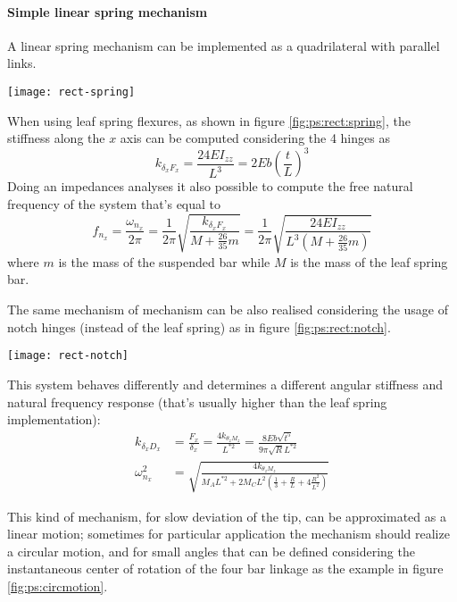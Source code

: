 		\paragraph{Simple linear spring mechanism} A linear spring mechanism can be implemented as a quadrilateral with parallel links.
		
		\begin{SCfigure}[2][bht]
			\centering
			\texttt{[image: rect-spring]}
			\caption{implementation of a rectilinear motion with leaf spring flexures.}
			\label{fig:ps:rect:spring}
		\end{SCfigure}
	
		When using leaf spring flexures, as shown in figure \ref{fig:ps:rect:spring}, the stiffness along the $x$ axis can be computed considering the 4 hinges as
		\[ k_{\delta_xF_x} = \frac{24EI_{zz}}{L^3} = 2 Eb \left( \frac tL\right)^3 \]
		Doing an impedances analyses it also possible to compute the free natural frequency of the system that's equal to
		\[ f_{n_x} = \frac{\omega_{n_x}}{2\pi} = \frac{1}{2\pi} \sqrt{\frac{k_{\delta_xF_x}}{M + \frac{26}{35}m}} = \frac 1 {2\pi} \sqrt{\frac{24 EI_{zz}}{L^3\left( M + \frac{26}{35}m \right)} }  \]
		where $m$ is the mass of the suspended bar while $M$ is the mass of the leaf spring bar.
		
		The same mechanism of mechanism can be also realised considering the usage of notch hinges (instead of the leaf spring) as in figure \ref{fig:ps:rect:notch}.
		
		\begin{SCfigure}[2][bht]
			\centering
			\texttt{[image: rect-notch]}
			\caption{implementation of a rectilinear motion with notch hinges.}
			\label{fig:ps:rect:notch}
		\end{SCfigure}
	
		This system behaves differently and determines a different angular stiffness and natural frequency response (that's usually higher than the leaf spring implementation):
		\begin{align*}
			k_{\delta_xD_x} & = \frac{F_x}{\delta_x} = \frac{4 k_{\theta_zM_z}}{L^{*2}} = \frac{8 E b \sqrt{t^5}}{9\pi \sqrt R L^{*2}} \\
			\omega^2_{n_x} & = \sqrt{\frac{4k_{\theta_zM_z}}{M_AL^{*2} + 2 M_CL^2\left( \frac 1 3 + \frac R L + 4\frac{R^2}{L^2} \right)  }}
		\end{align*}
		
		This kind of mechanism, for slow deviation of the tip, can be approximated as a linear motion; sometimes for particular application the mechanism should realize a circular motion, and for small angles that can be defined considering the instantaneous center of rotation of the four bar linkage as the example in figure \ref{fig:ps:circmotion}.
		
